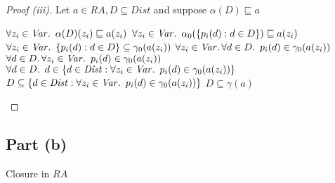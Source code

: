 \begin{prop}
  \begin{proof}[Proof (iii)]
    Let $a\in\mathit{RA},D\subseteq\mathit{Dist}$ and suppose $\alpha(D)\sqsubseteq a$
    \begin{itemize}
      \step[\iffs] $\forall z_i\in\mathit{Var}\ldotp~\alpha(D)(z_i)\sqsubseteq a(z_i)$
      \step[\iffs] $\forall z_i\in\mathit{Var}\ldotp~\alpha_0(\{p_i(d) : d\in D\})\sqsubseteq a(z_i)$
      \step[\iffs] $\forall z_i\in\mathit{Var}\ldotp~\{p_i(d) : d\in D\}\subseteq \gamma_0(a(z_i))$
      \step[\iffs] $\forall z_i\in\mathit{Var}\ldotp\forall d\in D\ldotp~p_i(d)\in\gamma_0(a(z_i))$
      \step[\iffs] $\forall d\in D\ldotp\forall z_i\in\mathit{Var}\ldotp~p_i(d)\in\gamma_0(a(z_i))$
      \step[\iffs] $\forall d\in D\ldotp~d\in\{d\in\mathit{Dist} : \forall z_i\in\mathit{Var}\ldotp~p_i(d)\in\gamma_0(a(z_i))\}$
      \step[\iffs] $D\subseteq\{d\in\mathit{Dist} : \forall z_i\in\mathit{Var}\ldotp~p_i(d)\in\gamma_0(a(z_i))\}$
      \step[\iffs] $D\subseteq\gamma(a)$\qedhere
    \end{itemize}
  \end{proof}
\end{prop}

\subsection{Part (b)}\label{sec:q-3-b}
\begin{algorithm}[htbp]

  \caption{Closure in $\mathit{RA}$}\label{alg:close-ra}
\end{algorithm}


